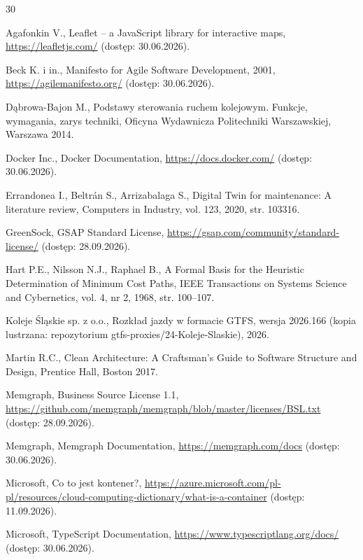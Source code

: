 \documentclass[twoside]{projektInzynierskiMS1z}
\begin{document}
\begin{thebibliography}{30}

 Agafonkin V., Leaflet -- a JavaScript library for interactive maps, \url{https://leafletjs.com/} (dostęp: 30.06.2026).

 Beck K. i in., Manifesto for Agile Software Development, 2001, \url{https://agilemanifesto.org/} (dostęp: 30.06.2026).

 Dąbrowa-Bajon M., Podstawy sterowania ruchem kolejowym. Funkcje, wymagania, zarys techniki, Oficyna Wydawnicza Politechniki Warszawskiej, Warszawa 2014.

 Docker Inc., Docker Documentation, \url{https://docs.docker.com/} (dostęp: 30.06.2026).

 Errandonea I., Beltrán S., Arrizabalaga S., Digital Twin for maintenance: A literature review, Computers in Industry, vol. 123, 2020, str. 103316.

 GreenSock, GSAP Standard License, \url{https://gsap.com/community/standard-license/} (dostęp: 28.09.2026).

 Hart P.E., Nilsson N.J., Raphael B., A Formal Basis for the Heuristic Determination of Minimum Cost Paths, IEEE Transactions on Systems Science and Cybernetics, vol. 4, nr 2, 1968, str. 100--107.

 Koleje Śląskie sp. z o.o., Rozkład jazdy w formacie GTFS, wersja 2026.166 (kopia lustrzana: repozytorium gtfs-proxies/24-Koleje-Slaskie), 2026.

 Martin R.C., Clean Architecture: A Craftsman's Guide to Software Structure and Design, Prentice Hall, Boston 2017.

 Memgraph, Business Source License 1.1, \url{https://github.com/memgraph/memgraph/blob/master/licenses/BSL.txt} (dostęp: 28.09.2026).

 Memgraph, Memgraph Documentation, \url{https://memgraph.com/docs} (dostęp: 30.06.2026).

 Microsoft, Co to jest kontener?, \url{https://azure.microsoft.com/pl-pl/resources/cloud-computing-dictionary/what-is-a-container} (dostęp: 11.09.2026).

 Microsoft, TypeScript Documentation, \url{https://www.typescriptlang.org/docs/} (dostęp: 30.06.2026).


\end{thebibliography}
\end{document}
